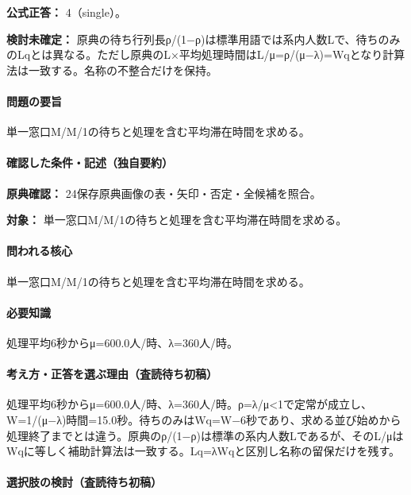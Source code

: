 \textbf{公式正答：} 4（single）。

\par\textbf{検討未確定：} 原典の待ち行列長ρ/(1−ρ)は標準用語では系内人数Lで、待ちのみのLqとは異なる。ただし原典のL×平均処理時間はL/μ=ρ/(μ−λ)=\allowbreak{}Wqとなり計算法は一致する。名称の不整合だけを保持。

\paragraph{問題の要旨} 単一窓口M/M/1の待ちと処理を含む平均滞在時間を求める。

\paragraph{確認した条件・記述（独自要約）}\mbox{}\par

\noindent\textbf{原典確認：} 24保存原典画像の表・矢印・否定・全候補を照合。\par

\noindent\textbf{対象：} 単一窓口M/M/1の待ちと処理を含む平均滞在時間を求める。\par

\paragraph{問われる核心} 単一窓口M/M/1の待ちと処理を含む平均滞在時間を求める。

\paragraph{必要知識} 処理平均6秒からμ=600.0人/時、λ=360人/時。

\paragraph{考え方・正答を選ぶ理由（査読待ち初稿）} 処理平均6秒からμ=600.0人/時、λ=360人/時。ρ=λ/μ<1で定常が成立し、W=\allowbreak{}1/(μ−λ)時間=15.0秒。待ちのみはWq=\allowbreak{}W−6秒であり、求める並び始めから処理終了までとは違う。原典のρ/(1−ρ)は標準の系内人数Lであるが、そのL/μはWqに等しく補助計算法は一致する。Lq=λWqと区別し名称の留保だけを残す。

\paragraph{選択肢の検討（査読待ち初稿）}\mbox{}\par

